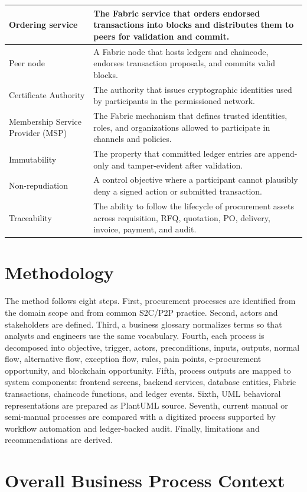 \documentclass[conference]{IEEEtran}
\begin{document}
\begin{table}[t]
\begin{tabularx}{\textwidth}{|L{3.0cm}|Y|}
Ordering service & The Fabric service that orders endorsed transactions into blocks and distributes them to peers for validation and commit. \\ \hline
Peer node & A Fabric node that hosts ledgers and chaincode, endorses transaction proposals, and commits valid blocks. \\ \hline
Certificate Authority & The authority that issues cryptographic identities used by participants in the permissioned network. \\ \hline
Membership Service Provider (MSP) & The Fabric mechanism that defines trusted identities, roles, and organizations allowed to participate in channels and policies. \\ \hline
Immutability & The property that committed ledger entries are append-only and tamper-evident after validation. \\ \hline
Non-repudiation & A control objective where a participant cannot plausibly deny a signed action or submitted transaction. \\ \hline
Traceability & The ability to follow the lifecycle of procurement assets across requisition, RFQ, quotation, PO, delivery, invoice, payment, and audit. \\ \hline
\end{tabularx}
\end{table}

\section{Methodology}
The method follows eight steps. First, procurement processes are identified from the domain scope and from common S2C/P2P practice. Second, actors and stakeholders are defined. Third, a business glossary normalizes terms so that analysts and engineers use the same vocabulary. Fourth, each process is decomposed into objective, trigger, actors, preconditions, inputs, outputs, normal flow, alternative flow, exception flow, rules, pain points, e-procurement opportunity, and blockchain opportunity. Fifth, process outputs are mapped to system components: frontend screens, backend services, database entities, Fabric transactions, chaincode functions, and ledger events. Sixth, UML behavioral representations are prepared as PlantUML source. Seventh, current manual or semi-manual processes are compared with a digitized process supported by workflow automation and ledger-backed audit. Finally, limitations and recommendations are derived.

\section{Overall Business Process Context}
\end{document}
